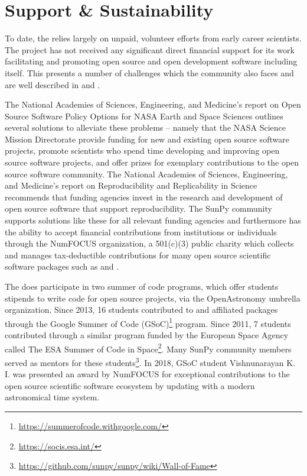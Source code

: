 \section{Support \& Sustainability}
\label{sec:support}

To date, the \sunpyproj relies largely on unpaid, volunteer efforts from early career scientists.
The project has not received any significant direct financial support for its work facilitating and promoting open source and open development software including \sunpypkg itself.
This presents a number of challenges which the \astropy community also faces and are well described in \cite{PriceWhelan:2018ji} and \cite{Muna2016}.

The National Academies of Sciences, Engineering, and Medicine's report on Open Source Software Policy Options for NASA Earth and Space Sciences \citep{NAP2018} outlines several solutions to alleviate these problems -- namely that the NASA Science Mission Directorate provide funding for new and existing open source software projects, promote scientists who spend time developing and improving open source software projects, and offer prizes for exemplary contributions to the open source software community.
The National Academies of Sciences, Engineering, and Medicine's report on Reproducibility and Replicability in Science \citep{NAP2019} recommends that funding agencies invest in the research and development of open source software that support reproducibility.
The SunPy community supports solutions like these for all relevant funding agencies and furthermore has the ability to accept financial contributions from institutions or individuals through the NumFOCUS organization, a 501(c)(3) public charity which collects and manages tax-deductible contributions for many open source scientific software packages such as \numpy and \astropy.

The \sunpyproj does participate in two summer of code programs, which offer students stipends to write code for open source projects, via the OpenAstronomy umbrella organization.
Since 2013, 16 students contributed to \sunpypkg and affiliated packages through the Google Summer of Code (GSoC)\footnote{\url{https://summerofcode.withgoogle.com/}} program.
Since 2011, 7 students contributed through a similar program funded by the European Space Agency called The ESA Summer of Code in Space\footnote{\url{https://socis.esa.int/}}.
Many SunPy community members served as mentors for these students\footnote{\url{https://github.com/sunpy/sunpy/wiki/Wall-of-Fame}}.
In 2018, GSoC student Vishnunarayan K. I. was presented an award by NumFOCUS for exceptional contributions to the open source scientific software ecosystem by updating \sunpypkg with a modern astronomical time system.
